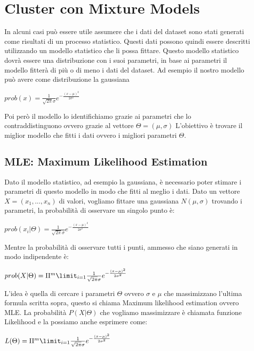 \documentclass[14pt]{extreport}
\begin{document}
\section{Cluster con Mixture Models}

In alcuni casi può essere utile assumere che i dati del dataset sono stati generati come risultati di un processo statistico. Questi dati possono quindi essere descritti utilizzando un modello statistico che li possa fittare. 
Questo modello statistico dovrà essere una distribuzione con i suoi parametri, in base ai parametri il modello fitterà di più o di meno i dati del dataset.
Ad esempio il nostro modello può avere come distribuzione la gaussiana 
\newline
\centerline{$prob(x) = \frac{1}{\sqrt{2\pi}\sigma}e^{-\frac{(x-\mu)^2}{2\sigma^2}}$}

Poi però il modello lo identifichiamo grazie ai parametri che lo contraddistinguono ovvero grazie al vettore $\Theta =(\mu,\sigma)$
L'obiettivo è trovare il miglior modello che fitti i dati ovvero i migliori parametri $\Theta$.

\subsection{MLE: Maximum Likelihood Estimation}

Dato il modello statistico, ad esempio la gaussiana, è necessario poter stimare i parametri di questo modello in modo che fitti al meglio i dati.
Dato un vettore $X = (x_1,...,x_n)$ di valori, vogliamo fittare una gaussiana $N(\mu,\sigma)$ trovando i parametri, la probabilità di osservare un singolo punto è:
\newline
\centerline{$prob(x_i|\Theta) = \frac{1}{\sqrt{2\pi}\sigma}e^{-\frac{(x-\mu)^2}{2\sigma^2}}$}

Mentre la probabilità di osservare tutti i punti, ammesso che siano generati in modo indipendente è:
\newline 
\centerline{$prob(X|\Theta) = \Pi^m \limit_{i=1} \frac{1}{\sqrt{2\pi}\sigma}e^{-\frac{(x-\mu)^2}{2\sigma^2}}$}

L'idea è quella di cercare i parametri $\Theta$ ovvero $\sigma$ e $\mu$ che massimizzano l'ultima formula scritta sopra, questo si chiama Maximum likelihood estimation ovvero MLE.
La probabilità $P(X|\Theta)$ che vogliamo massimizzare è chiamata funzione Likelihood e la possiamo anche esprimere come:
\newline
\centerline{$L(\Theta) = \Pi^m \limit_{i=1} \frac{1}{\sqrt{2\pi}\sigma}e^{-\frac{(x-\mu)^2}{2\sigma^2}}$}
\end{document}
